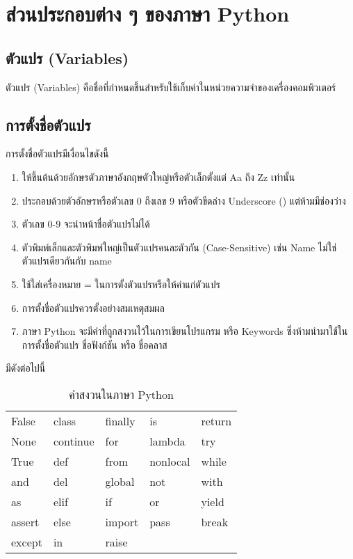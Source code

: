 \chapter{ส่วนประกอบต่าง ๆ ของภาษา Python}

\section{ตัวแปร (Variables)}

ตัวแปร (Variables) คือชื่อที่กำหนดขึ้นสำหรับใช้เก็บค่าในหน่วยความจำของเครื่องคอมพิวเตอร์

\section{การตั้งชื่อตัวแปร}

การตั้งชื่อตัวแปรมีเงื่อนไขดังนี้

\begin{enumerate}[noitemsep]
\item ให้ขึ้นต้นด้วยอักษรตัวภาษาอังกฤษตัวใหญ่หรือตัวเล็กตั้งแต่ Aa ถึง Zz เท่านั้น 
\item ประกอบด้วยตัวอักษรหรือตัวเลข 0 ถึงเลข 9 หรือตัวขีดล่าง Underscore (\pyinline{_}) แต่ห้ามมีช่องว่าง
\item ตัวเลข 0-9 จะนำหน้าชื่อตัวแปรไม่ได้
\item ตัวพิมพ์เล็กและตัวพิมพ์ใหญ่เป็นตัวแปรคนละตัวกัน (Case-Sensitive) เช่น Name ไม่ใช่ตัวแปรเดียวกันกับ name 
\item ใช้ใส่เครื่องหมาย = ในการตั้งตัวแปรหรือให้ค่าแก่ตัวแปร
\item การตั้งชื่อตัวแปรควรตั้งอย่างสมเหตุสมผล 
\item ภาษา Python จะมีคำที่ถูกสงวนไว้ในการเขียนโปรแกรม หรือ Keywords ซึ่งห้ามนำมาใช้ในการตั้งชื่อตัวแปร ชื่อฟังก์ชัน หรือ ชื่อคลาส 
\end{enumerate}

มีดังต่อไปนี้ \cite{lutz2014}

\begin{table}
\caption{คำสงวนในภาษา Python}
\centering
\begin{tabu}{l l l l l}
\rowfont{\ttfamily}
False & class & finally & is & return \\
\rowfont{\ttfamily}
None & continue & for & lambda & try \\
\rowfont{\ttfamily}
True & def & from & nonlocal & while \\
\rowfont{\ttfamily}
and & del & global & not & with \\
\rowfont{\ttfamily}
as & elif & if & or & yield \\
\rowfont{\ttfamily}
assert & else & import & pass & break \\
\rowfont{\ttfamily}
except & in & raise && \\
\end{tabu}
\end{table}

